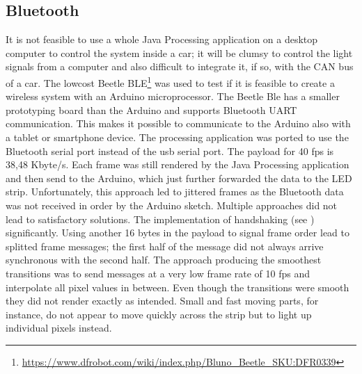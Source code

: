 \subsection{Bluetooth}
\label{ssec:bluettoth}
It is not feasible to use a whole Java Processing application on a desktop computer to control the system inside a car; it will be clumsy to control the light signals from a computer and also difficult to integrate it, if so, with the CAN bus of a car. The lowcost Beetle BLE\footnote{\url{https://www.dfrobot.com/wiki/index.php/Bluno_Beetle_SKU:DFR0339}} was used to test if it is feasible to create a wireless system with an Arduino microprocessor. The Beetle Ble has a smaller prototyping board than the Arduino and supports Bluetooth UART communication. This makes it possible to communicate to the Arduino also with a tablet or smartphone device. The processing application was ported to use the Bluetooth serial port instead of the usb serial port. The payload for 40 fps is 38,48 Kbyte/s.
Each frame was still rendered by the Java Processing application and then send to the Arduino, which just further forwarded the data to the LED strip. Unfortunately, this approach led to jittered frames as the Bluetooth data was not received in order by the Arduino sketch. Multiple approaches did not lead to satisfactory solutions. The implementation of handshaking (see \emph{}) significantly. Using another 16 bytes in the payload to signal frame order lead to splitted frame messages; the first half of the message did not always arrive synchronous with the second half. The approach producing the smoothest transitions was to send messages at a very low frame rate of 10 fps and interpolate all pixel values in between. Even though the transitions were smooth they did not render exactly as intended. Small and fast moving parts, for instance, do not appear to move quickly across the strip but to light up individual pixels instead. 

